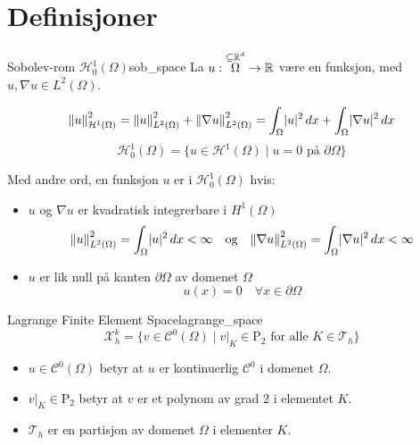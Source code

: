 \documentclass[a4paper,10pt]{article}
\begin{document}

\clearpage

\section{Definisjoner}
\begin{definition}{Sobolev-rom $\mathcal{H}_0^1(\Omega)$}{sob_space}
	La $u:\overset{\subseteq \R^d}{\Omega} \to \R$ være en funksjon, med $u, \nabla u \in L^2(\Omega)$.

	\begin{equation}
		\norm*{u}_{\mathcal{H}^1(\Omega)}^2 = \norm*{u}_{L^2(\Omega)}^2 + \norm*{\nabla u}_{L^2(\Omega)}^2
		= \int_\Omega \abs{u}^2 \, dx + \int_\Omega \abs{\nabla u}^2 \, dx
	\end{equation}
	\begin{equation}
		\mathcal{H}_0^1(\Omega) = \{u \in \mathcal{H}^1(\Omega) \mid u = 0 \text{ på } \partial \Omega\}
	\end{equation}

	Med andre ord, en funksjon $u$ er i $\mathcal{H}^1_0(\Omega)$ hvis:
	\begin{itemize}
		\item $u$ og $\nabla u$ er kvadratisk integrerbare i $H^1(\Omega)$
		      \begin{equation}
			      \norm*{u}_{L^2(\Omega)}^2 = \int_\Omega \abs{u}^2 \, dx < \infty \quad \text{og} \quad \norm*{\nabla u}_{L^2(\Omega)}^2 = \int_\Omega \abs{\nabla u}^2 \, dx < \infty
		      \end{equation}
		\item $u$ er lik null på kanten $\partial \Omega$ av domenet $\Omega$
		      \begin{equation}
			      u(x) = 0 \quad \forall x \in \partial \Omega
		      \end{equation}
	\end{itemize}
\end{definition}

\begin{definition}{Lagrange Finite Element Space}{lagrange_space}
	\begin{equation}
		\mathcal{X}_h^k = \{v \in \mathcal{C}^0(\Omega) \mid v\big|_K \in \mathrm{P}_2 \text{ for alle } K \in \mathcal{T}_h\}
	\end{equation}
	\begin{itemize}
		\item $u \in \mathcal{C}^0(\Omega)$ betyr at $u$ er kontinuerlig \(\mathcal{C}^0\) i domenet \(\Omega\).
		\item $v\big|_K \in \mathrm{P}_2$ betyr at $v$ er et polynom av grad 2 i elementet \(K\).
		\item \(\mathcal{T}_h\) er en partisjon av domenet \(\Omega\) i elementer \(K\).
	\end{itemize}
\end{definition}
\end{document}

